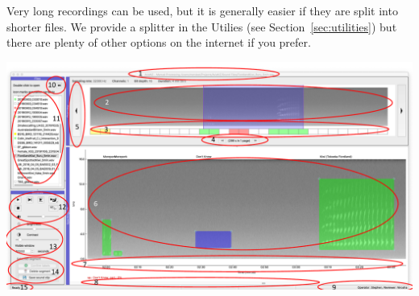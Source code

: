 \documentclass{article}
\begin{document}
Very long recordings can be used, but it is generally easier if they are split into shorter files. We provide a splitter in the Utilies (see Section~\ref{sec:utilities}) but there are plenty of other options on the internet if you prefer.

\begin{center}
\includegraphics[width=.8\textwidth]{Figures/AviaNZInterface.pdf}
\end{center}
\end{document}
